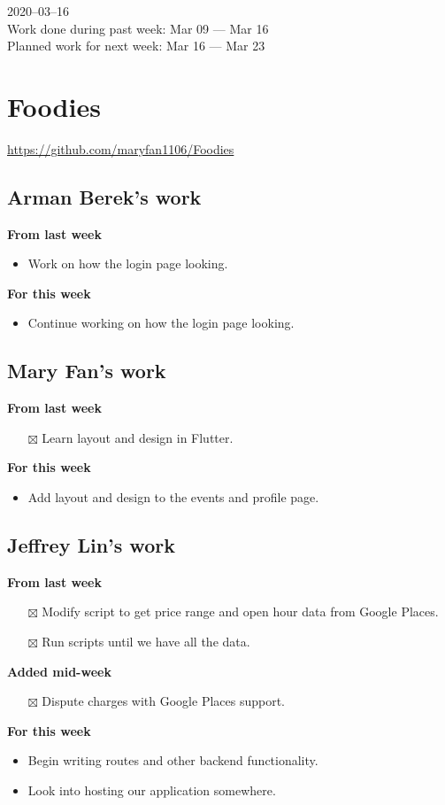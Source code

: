 \documentclass[12pt,letterpaper]{article}
\newcommand{\done}{$\boxtimes$}
\begin{document}
2020--03--16 \\
Work done during past week: Mar 09 --- Mar 16 \\
Planned work for next week: Mar 16 --- Mar 23

\section*{Foodies}
\url{https://github.com/maryfan1106/Foodies}

\subsection*{Arman Berek's work}

\textbf{From last week}
\begin{itemize}
  \item Work on how the login page looking.
\end{itemize}


\textbf{For this week}
\begin{itemize}
  \item Continue working on how the login page looking.
\end{itemize}


\subsection*{Mary Fan's work}

\textbf{From last week}
\begin{itemize}
  \item[\done] Learn layout and design in Flutter.
\end{itemize}


\textbf{For this week}
\begin{itemize}
  \item Add layout and design to the events and profile page.
\end{itemize}


\subsection*{Jeffrey Lin's work}

\textbf{From last week}
\begin{itemize}
  \item[\done] Modify script to get price range and open hour data from Google Places.
  \item[\done] Run scripts until we have all the data.
\end{itemize}

\textbf{Added mid-week}
\begin{itemize}
  \item[\done] Dispute charges with Google Places support.
\end{itemize}

\textbf{For this week}
\begin{itemize}
  \item Begin writing routes and other backend functionality.
  \item Look into hosting our application somewhere.
\end{itemize}
\end{document}
